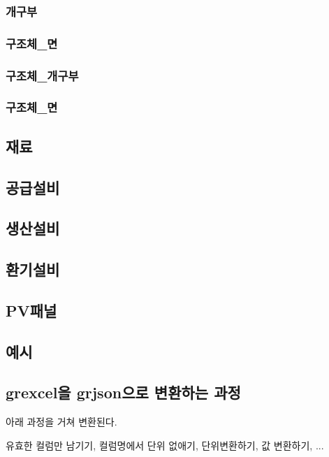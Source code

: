\subsubsection{개구부}

\subsubsection{구조체\_면}

\subsubsection{구조체\_개구부}

\subsubsection{구조체\_면}

\subsection{재료}

\subsection{공급설비}

\subsection{생산설비}

\subsection{환기설비}

\subsection{PV패널}

\subsection{예시}

\subsection{grexcel을 grjson으로 변환하는 과정}
아래 과정을 거쳐 변환된다.

유효한 컬럼만 남기기, 
컬럼명에서 단위 없애기, 
단위변환하기, 
값 변환하기, 
...

